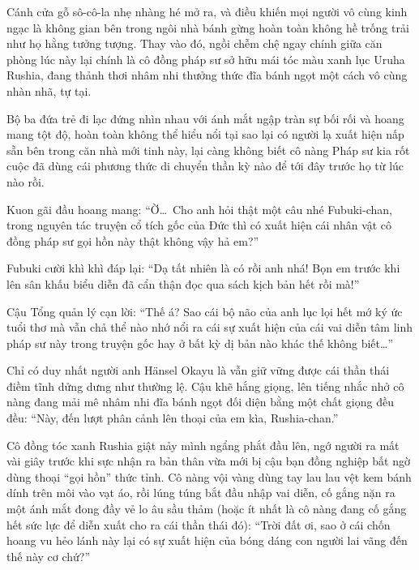 \documentclass[../main.tex]{subfiles}
\begin{document}
\il

Cánh cửa gỗ sô-cô-la nhẹ nhàng hé mở ra, và điều khiến mọi người vô cùng kinh ngạc là không gian bên trong ngôi nhà bánh gừng hoàn toàn không hề trống trải như họ hằng tưởng tượng. Thay vào đó, ngồi chễm chệ ngay chính giữa căn phòng lúc này lại chính là cô đồng pháp sư sở hữu mái tóc màu xanh lục Uruha Rushia, đang thảnh thơi nhâm nhi thưởng thức đĩa bánh ngọt một cách vô cùng nhàn nhã, tự tại.

Bộ ba đứa trẻ đi lạc đứng nhìn nhau với ánh mắt ngập tràn sự bối rối và hoang mang tột độ, hoàn toàn không thể hiểu nổi tại sao lại có người lạ xuất hiện nấp sẵn bên trong căn nhà mới tinh này, lại càng không biết cô nàng Pháp sư kia rốt cuộc đã dùng cái phương thức di chuyển thần kỳ nào để tới đây trước họ từ lúc nào rồi.


\il

Kuon gãi đầu hoang mang: ``Ờ\dots\ Cho anh hỏi thật một câu nhé Fubuki-chan, trong nguyên tác truyện cổ tích gốc của Đức thì có xuất hiện cái nhân vật cô đồng pháp sư gọi hồn này thật không vậy hả em?''

Fubuki cười khì khì đáp lại: ``Dạ tất nhiên là có rồi anh nhá! Bọn em trước khi lên sân khấu biểu diễn đã cẩn thận đọc qua sách kịch bản hết rồi mà!''

Cậu Tổng quản lý cạn lời: ``Thế á? Sao cái bộ não của anh lục lọi hết mớ ký ức tuổi thơ mà vẫn chả thể nào nhớ nổi ra cái sự xuất hiện của cái vai diễn tâm linh pháp sư này trong truyện gốc hay ở bất kỳ dị bản nào khác thế không biết\dots''

\il

Chỉ có duy nhất người anh Hänsel Okayu là vẫn giữ vững được cái thần thái điềm tĩnh dửng dưng như thường lệ. Cậu khẽ hắng giọng, lên tiếng nhắc nhở cô nàng đang mải mê nhâm nhi đĩa bánh ngọt đối diện bằng một chất giọng đều đều: ``Này, đến lượt phân cảnh lên thoại của em kìa, Rushia-chan.''

Cô đồng tóc xanh Rushia giật nảy mình ngẩng phắt đầu lên, ngớ người ra mất vài giây trước khi sực nhận ra bản thân vừa mới bị cậu bạn đồng nghiệp bất ngờ dùng thoại ``gọi hồn'' thức tỉnh. Cô nàng vội vàng dùng tay lau lau vệt kem bánh dính trên môi vào vạt áo, rồi lúng túng bắt đầu nhập vai diễn, cố gắng nặn ra một ánh mắt đong đầy vẻ lo âu sầu thảm (hoặc ít nhất là cô nàng đang cố gắng hết sức lực để diễn xuất cho ra cái thần thái đó): ``Trời đất ơi, sao ở cái chốn hoang vu hẻo lánh này lại có sự xuất hiện của bóng dáng con người lai vãng đến thế này cơ chứ?''
\end{document}
